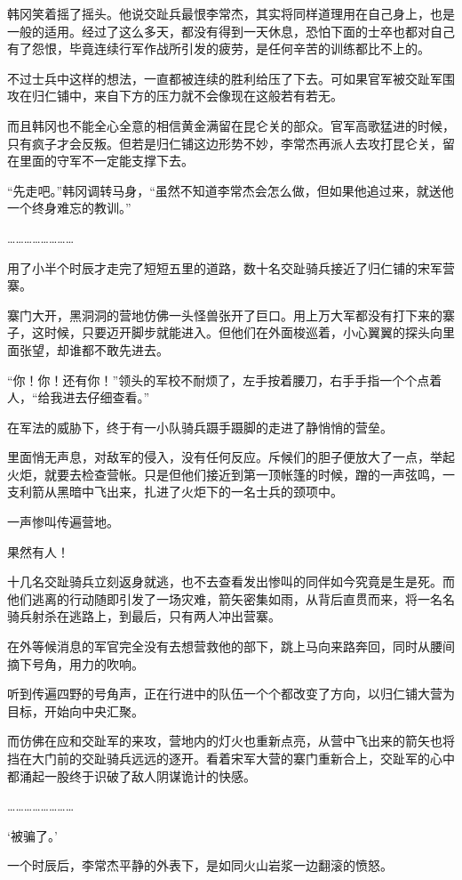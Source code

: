 韩冈笑着摇了摇头。他说交趾兵最恨李常杰，其实将同样道理用在自己身上，也是一般的适用。经过了这么多天，都没有得到一天休息，恐怕下面的士卒也都对自己有了怨恨，毕竟连续行军作战所引发的疲劳，是任何辛苦的训练都比不上的。

不过士兵中这样的想法，一直都被连续的胜利给压了下去。可如果官军被交趾军围攻在归仁铺中，来自下方的压力就不会像现在这般若有若无。

而且韩冈也不能全心全意的相信黄金满留在昆仑关的部众。官军高歌猛进的时候，只有疯子才会反叛。但若是归仁铺这边形势不妙，李常杰再派人去攻打昆仑关，留在里面的守军不一定能支撑下去。

“先走吧。”韩冈调转马身，“虽然不知道李常杰会怎么做，但如果他追过来，就送他一个终身难忘的教训。”

……………………

用了小半个时辰才走完了短短五里的道路，数十名交趾骑兵接近了归仁铺的宋军营寨。

寨门大开，黑洞洞的营地仿佛一头怪兽张开了巨口。用上万大军都没有打下来的寨子，这时候，只要迈开脚步就能进入。但他们在外面梭巡着，小心翼翼的探头向里面张望，却谁都不敢先进去。

“你！你！还有你！”领头的军校不耐烦了，左手按着腰刀，右手手指一个个点着人，“给我进去仔细查看。”

在军法的威胁下，终于有一小队骑兵蹑手蹑脚的走进了静悄悄的营垒。

里面悄无声息，对敌军的侵入，没有任何反应。斥候们的胆子便放大了一点，举起火炬，就要去检查营帐。只是但他们接近到第一顶帐篷的时候，蹭的一声弦鸣，一支利箭从黑暗中飞出来，扎进了火炬下的一名士兵的颈项中。

一声惨叫传遍营地。

果然有人！

十几名交趾骑兵立刻返身就逃，也不去查看发出惨叫的同伴如今究竟是生是死。而他们逃离的行动随即引发了一场灾难，箭矢密集如雨，从背后直贯而来，将一名名骑兵射杀在逃路上，到最后，只有两人冲出营寨。

在外等候消息的军官完全没有去想营救他的部下，跳上马向来路奔回，同时从腰间摘下号角，用力的吹响。

听到传遍四野的号角声，正在行进中的队伍一个个都改变了方向，以归仁铺大营为目标，开始向中央汇聚。

而仿佛在应和交趾军的来攻，营地内的灯火也重新点亮，从营中飞出来的箭矢也将挡在大门前的交趾骑兵远远的逐开。看着宋军大营的寨门重新合上，交趾军的心中都涌起一股终于识破了敌人阴谋诡计的快感。

……………………

‘被骗了。’

一个时辰后，李常杰平静的外表下，是如同火山岩浆一边翻滚的愤怒。

